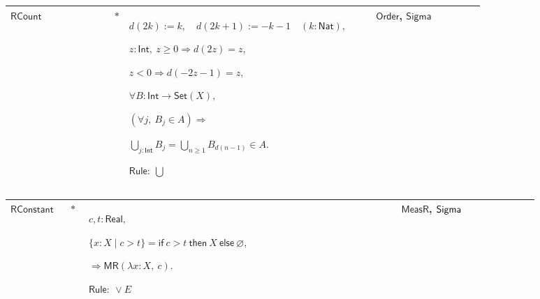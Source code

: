 \documentclass[12pt,reqno]{amsart}
\theoremstyle{blueplain}
\numberwithin{equation}{section}
\newlength{\DCTOneColumnBody}
\begin{document}
{\scriptsize \setlength{\parskip}{0pt}\nointerlineskip
\noindent 
\begin{tabular}{|@{}>{\centering\arraybackslash}m{\DCTOneColumnBody}|}
\hline
$\displaystyle \mathsf{Context\_R}:=$\par$\displaystyle u,v:\mathsf{RF},\quad%
\mathsf{MR}(u)\land\mathsf{MR}(v),$\par$\displaystyle t:\mathsf{Real},\quad
S\in A.$ \\ \hline
\end{tabular}%
}

{\scriptsize \setlength{\parskip}{0pt}\nointerlineskip
\noindent 
\begin{tabular}{|@{}>{\centering\arraybackslash}m{0.10658\linewidth}|>{\centering\arraybackslash}m{0.03553\linewidth}|>{\centering\arraybackslash}m{0.52105\linewidth}|>{\centering\arraybackslash}m{0.23684\linewidth}|}
\hline
\hypertarget{dct:RCount}{$\displaystyle \mathsf{RCount}$} & $\displaystyle %
\ast$ & $\displaystyle d(2k):=k,\quad d(2k+1):=-k-1\quad(k:\mathsf{Nat}),$%
\par$\displaystyle z:\mathsf{Int},\ z\ge0\Rightarrow d(2z)=z,$\par$%
\displaystyle z<0\Rightarrow d(-2z-1)=z,$\par$\displaystyle \forall B:%
\mathsf{Int}\to\mathsf{Set}(X),$\par$\displaystyle (\forall j,\ B_j\in
A)\Rightarrow$\par$\displaystyle \bigcup_{j:\mathsf{Int}}B_j=\bigcup_{n%
\ge1}B_{d(n-1)}\in A.$\par$\displaystyle \mathsf{Rule}:\ \bigcup$ & 
\hyperlink{ax:Order}{$\displaystyle \mathsf{Order}$}, \hyperlink{ax:Sigma}{$%
\displaystyle \mathsf{Sigma}$} \\ \hline
\end{tabular}%
}

{\scriptsize \setlength{\parskip}{0pt}\nointerlineskip
\noindent 
\begin{tabular}{|@{}>{\centering\arraybackslash}m{0.10658\linewidth}|>{\centering\arraybackslash}m{0.03553\linewidth}|>{\centering\arraybackslash}m{0.52105\linewidth}|>{\centering\arraybackslash}m{0.23684\linewidth}|}
\hline
\hypertarget{dct:RConstant}{$\displaystyle \mathsf{RConstant}$} & $%
\displaystyle \ast$ & $\displaystyle c,t:\mathsf{Real},$\par$\displaystyle %
\{x:X\mid c>t\}=\mathsf{if}\ c>t\ \mathsf{then}\ X\ \mathsf{else}\
\varnothing,$\par$\displaystyle \Rightarrow\mathsf{MR}(\lambda x:X,\ c).$\par%
$\displaystyle \mathsf{Rule}:\ \lor E$ & \hyperlink{dctdef:MeasR}{$%
\displaystyle \mathsf{MeasR}$}, \hyperlink{ax:Sigma}{$\displaystyle \mathsf{%
Sigma}$} \\ \hline
\end{tabular}%
}
\end{document}
